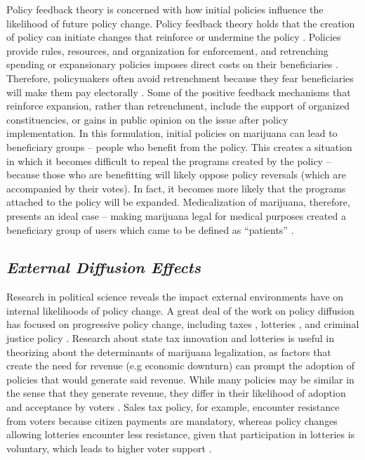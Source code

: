 Policy feedback theory is concerned with how initial policies influence the likelihood of future policy change. Policy feedback theory holds that the creation of policy can initiate changes that reinforce or undermine the policy \citep{pierson_2000,skocpol_1992}. Policies provide rules, resources, and organization for enforcement, and retrenching spending or expansionary policies imposes direct costs on their beneficiaries \citep{pierson_1996}. Therefore, policymakers often avoid retrenchment because they fear beneficiaries will make them pay electorally \citep{pierson_1996}. Some of the positive feedback mechanisms that reinforce expansion, rather than retrenchment, include the support of organized constituencies, or gains in public opinion on the issue after policy implementation. In this formulation, initial policies on marijuana can lead to beneficiary groups -- people who benefit from the policy. This creates a situation in which it becomes difficult to repeal the programs created by the policy -- because those who are benefitting will likely oppose policy reversals (which are accompanied by their votes). In fact, it becomes more likely that the programs attached to the policy will be expanded. Medicalization of marijuana, therefore, presents an ideal case -- making marijuana legal for medical purposes created a beneficiary group of users which came to be defined as ``patients'' \citep{newhart_and_dolphin_2018}. 


\subsection{\it{External Diffusion Effects}}

Research in political science reveals the impact external environments have on internal likelihoods of policy change. A great deal of the work on policy diffusion has focused on progressive policy change, including taxes \citep{mikesell_and_zorn_1986}, lotteries \citep{berry_and_berry_1990}, and criminal justice policy \citep{boushey_2016}. Research about state tax innovation and lotteries is useful in theorizing about the determinants of marijuana legalization, as factors that create the need for revenue (e.g economic downturn) can prompt the adoption of policies that would generate said revenue. While many policies may be similar in the sense that they generate revenue, they differ in their likelihood of adoption and acceptance by voters \citep{berry_and_berry_1990}. Sales tax policy, for example, encounter resistance from voters because citizen payments are mandatory, whereas policy changes allowing lotteries encounter less resistance, given that participation in lotteries is voluntary, which leads to higher voter support \citep{mikesell_and_zorn_1986}. 


